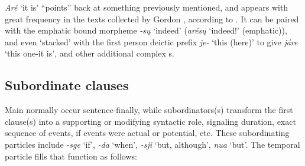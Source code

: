 \documentclass[output=paper]{LSP/langsci}
\begin{document}
\begin{table}
\caption{Comparison of demonstrative pronouns to deictic directional prefixes} \label{demonstrative}
\end{table}

\textit{Aré} `it is' ``points'' back at something previously mentioned, and appears with great frequency in the texts collected by Gordon \citet{Marsh1936}, according to \citet{HopkinsFurbee1989}. It can be paired with the emphatic bound morpheme \textit{-s\k{u}} `indeed' (\textit{arés\k{u}} `indeed!' (emphatic)), and even `stacked' with the first person deictic prefix \textit{je-} `this (here)' to give \textit{járe} `this one-it is', and other additional complex s.    

\subsection{Subordinate clauses}
Main  normally occur sentence-finally, while subordinators(s) transform the first clause(s) into a supporting or modifying syntactic role, signaling duration, exact sequence of events, if events were actual or potential, etc. These subordinating particles include \textit{-sge} `if', \textit{-da} `when',  \textit{-sji}  `but, although', \textit{nua} `but'.   The temporal particle fills that function as follows:
\end{document}
